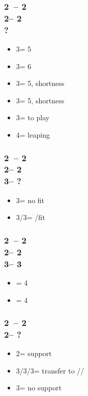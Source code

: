 \documentclass[12pt, a4paper]{article}
\begin{document}
\subsubsection*{2\clubs\ -- 2\diams\\
                2\hearts -- 2\spades\\
                ?}
\begin{itemize}
    \item 3\clubs = 5\spades
    \item 3\diams = 6\hearts
    \item 3\hearts = 5\spades, \spades shortness
    \item 3\spades = 5\clubs, \spades shortness
    \item 3\nt = to play
    \item 4\minor = leaping
\end{itemize}

\subsubsection*{2\clubs\ -- 2\diams\\
                2\hearts -- 2\spades\\
                3\clubs -- ?}
\begin{itemize}
    \item 3\diams = no fit
    \item 3\hearts/3\spades = \hearts/\spades fit
\end{itemize}

\subsubsection*{2\clubs\ -- 2\diams\\
                2\hearts -- 2\spades\\
                3\clubs -- 3}
\begin{itemize}
    \item {} = 4\clubs
    \item {} = 4\diams
\end{itemize}

\subsubsection*{2\clubs\ -- 2\diams\\
                2\spades -- ?}
\begin{itemize}
    \item 2\nt = support
    \item 3\clubs/3\diams/3\hearts = transfer to \diams/\hearts/\clubs
    \item 3\spades = no support
\end{itemize}
\end{document}
